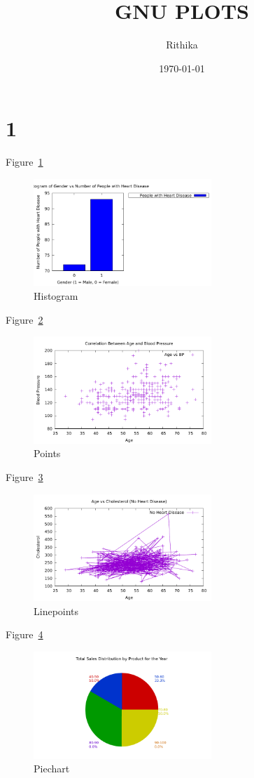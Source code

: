 \documentclass{article}
\begin{document}
\title{GNU PLOTS}
\author{Rithika}
\date{\today}
\maketitle



\section*{1}
Figure~\ref{a}  

\begin{figure}[h!]
    \centering
    \includegraphics[width=0.6\textwidth]{4a.pdf}
    \caption{Histogram}
    \label{a}
\end{figure}


 Figure~\ref{b}  

\begin{figure}[h!]
    \centering
    \includegraphics[width=0.6\textwidth]{4b.pdf}
    \caption{Points}
    \label{b}
\end{figure}

 Figure~\ref{c}  

\begin{figure}[h!]
    \centering
    \includegraphics[width=0.6\textwidth]{4c.pdf}
    \caption{Linepoints}
    \label{c}
\end{figure}

 Figure~\ref{d}  

\begin{figure}[h!]
    \centering
    \includegraphics[width=0.6\textwidth]{d.pdf}
    \caption{Piechart}
    \label{d}
\end{figure}
\end{document}
